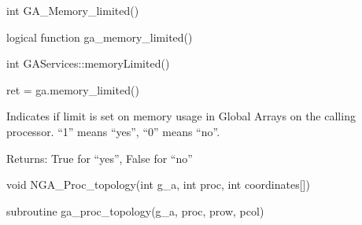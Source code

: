 \documentclass[10pt]{article}
\begin{document}
\begin{capi}
\begin{ccode}
int GA_Memory_limited()
\end{ccode}
\end{capi}

\begin{fapi}
\begin{fcode}
logical function ga_memory_limited()
\end{fcode}
\end{fapi}

\begin{cxxapi}
\begin{cxxcode}
int GAServices::memoryLimited()
\end{cxxcode}
\end{cxxapi}

\begin{pyapi}
\begin{pycode}
ret = ga.memory_limited()
\end{pycode}
\end{pyapi}

\local

\begin{desc}

Indicates if limit is set on memory usage in Global Arrays on the calling
processor.  ``1'' means ``yes'', ``0'' means ``no''.

Returns: True for ``yes'', False for ``no''

\end{desc}


\begin{capi}
\begin{ccode}
void NGA_Proc_topology(int g_a, int proc, int coordinates[])
\end{ccode}
\begin{funcargs}
\end{funcargs}
\end{capi}

\begin{fapi}
\begin{fcode}
subroutine ga_proc_topology(g_a, proc, prow, pcol)
\end{fcode}
\begin{funcargs}
\end{funcargs}
\end{fapi}
\end{document}
